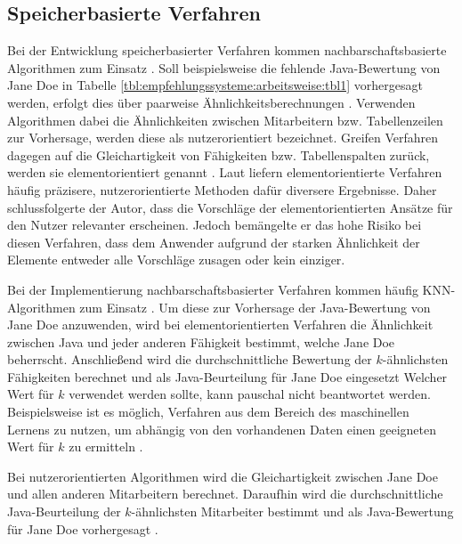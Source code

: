 \subsection{Speicherbasierte Verfahren}
\label{ch:empfehlungssysteme:cf:speicherbasiert}
Bei der Entwicklung speicherbasierter Verfahren kommen nachbarschaftsbasierte Algorithmen zum Einsatz \cite[S. 29]{recommenderSystems:2016}. Soll beispielsweise die fehlende Java-Bewertung von Jane Doe in Tabelle \ref{tbl:empfehlungssysteme:arbeitsweise:tbl1} vorhergesagt werden, erfolgt dies über paarweise Ähnlichkeitsberechnungen \cite[S. 2f.]{bharti:2019}. Verwenden Algorithmen dabei die Ähnlichkeiten zwischen Mitarbeitern bzw. Tabellenzeilen zur Vorhersage, werden diese als nutzerorientiert bezeichnet. Greifen Verfahren dagegen auf die Gleichartigkeit von Fähigkeiten bzw. Tabellenspalten zurück, werden sie elementorientiert genannt \cite[S. 1f.]{duong:2018}. Laut \textcite[S. 42]{recommenderSystems:2016} liefern elementorientierte Verfahren häufig präzisere, nutzerorientierte Methoden dafür diversere Ergebnisse. Daher schlussfolgerte der Autor, dass die Vorschläge der elementorientierten Ansätze für den Nutzer relevanter erscheinen. Jedoch bemängelte er das hohe Risiko bei diesen Verfahren, dass dem Anwender aufgrund der starken Ähnlichkeit der Elemente entweder alle Vorschläge zusagen oder kein einziger.

Bei der Implementierung nachbarschaftsbasierter Verfahren kommen häufig \ac{KNN}-Algorithmen zum Einsatz \cite[S. 1]{nayak:2018}. Um diese zur Vorhersage der Java-Bewertung von Jane Doe anzuwenden, wird bei elementorientierten Verfahren die Ähnlichkeit zwischen Java und jeder anderen Fähigkeit bestimmt, welche Jane Doe beherrscht. Anschließend wird die durchschnittliche Bewertung der $k$-ähnlichsten Fähigkeiten berechnet und als Java-Beurteilung für Jane Doe eingesetzt \cite[S. 2]{hao:2013} Welcher Wert für $k$ verwendet werden sollte, kann pauschal nicht beantwortet werden. Beispielsweise ist es möglich, Verfahren aus dem Bereich des maschinellen Lernens zu nutzen, um abhängig von den vorhandenen Daten einen geeigneten Wert für $k$ zu ermitteln \cite[S. 2f.]{jiang:2007}.

Bei nutzerorientierten Algorithmen wird die Gleichartigkeit zwischen Jane Doe und allen anderen Mitarbeitern berechnet. Daraufhin wird die durchschnittliche Java-Beurteilung der $k$-ähnlichsten Mitarbeiter bestimmt und als Java-Bewertung für Jane Doe vorhergesagt \cite[S. 2f.]{hao:2013}.

